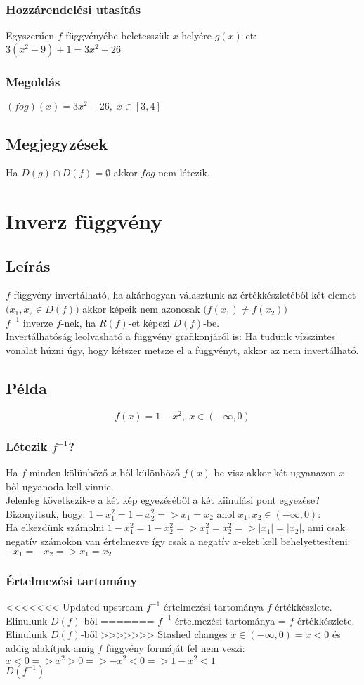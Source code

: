 \documentclass{article}
\theoremstyle{mytheoremstyle}
\theoremstyle{mytheoremstyle}
\theoremstyle{myproblemstyle}
\begin{document}
\subsubsection{Hozzárendelési utasítás}
Egyszerűen $f$ függvényébe beletesszük $x$ helyére $g(x)$-et:\\
$3(x^2-9)+1 = 3x^2-26$
\subsubsection{Megoldás}
$(fog)(x) = 3x^2-26,\;x\in [3,4]$
\subsection{Megjegyzések}
Ha $D(g) \cap D(f) = \emptyset$ akkor $fog$ nem létezik.
\section{Inverz függvény}
\subsection{Leírás}
$f$ függvény invertálható, ha akárhogyan választunk az értékkészletéből
két elemet $\bigl(x_1,x_2\in D(f)\bigr)$ akkor képeik nem azonosak
$\bigl(f(x_1)\neq f(x_2)\bigr)$\\
$f^{-1}$ inverze $f$-nek, ha $R(f)$-et képezi $D(f)$-be.\\
Invertálhatóság leolvasható a függvény grafikonjáról is:
Ha tudunk vízszintes vonalat húzni úgy, hogy kétszer metsze el a függvényt,
akkor az nem invertálható.\\
\subsection{Példa}
$$f(x)=1-x^2,\;x\in (-\infty ,0)$$
\subsubsection{Létezik $f^{-1}$?}
Ha $f$ minden kölünböző $x$-ből különböző $f(x)$-be visz akkor két ugyanazon
$x$-ből ugyanoda kell vinnie.\\
Jelenleg következik-e a két kép egyezéséből a két kiinulási pont egyezése?\\
Bizonyítsuk, hogy: $1-x_1^2=1-x_2^2=>x_1=x_2$ ahol $x_1,x_2\in (-\infty,0)$:\\
Ha elkezdünk számolni $1-x_1^2=1-x_2^2=>x_1^2=x_2^2=>|x_1|=|x_2|$, ami csak negatív számokon
van értelmezve így csak a negatív $x$-eket kell behelyettesíteni:
$-x_1=-x_2=>x_1=x_2$\\
\subsubsection{Értelmezési tartomány}
<<<<<<< Updated upstream
$f^{-1}$ értelmezési tartománya $f$ értékkészlete. Elinulunk $D(f)$-ből
=======
$f^{-1}$ értelmezési tartománya = $f$ értékkészlete. Elinulunk $D(f)$-ből 
>>>>>>> Stashed changes
$x\in (-\infty ,0)=x<0$
és addig alakítjuk amíg $f$ függvény formáját fel nem veszi:\\
$x<0=>x^2>0=>-x^2<0=>1-x^2<1$\\
$D(f^{-1})$
\end{document}
